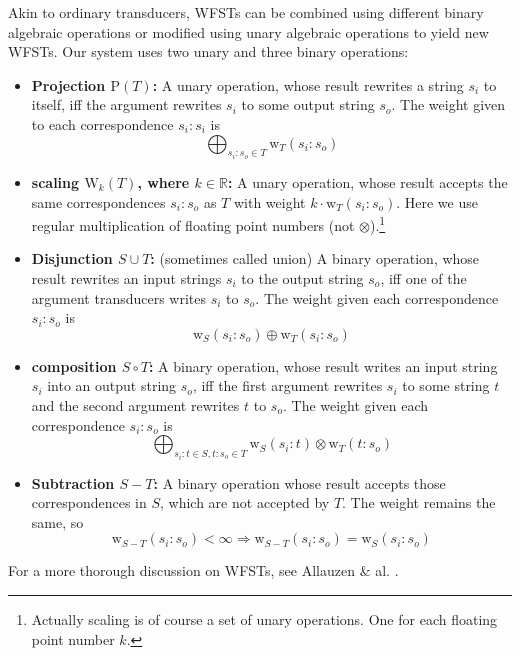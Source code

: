\documentclass[a4paper,conference]{IEEEtran}
\begin{document}
Akin to ordinary transducers, WFSTs can be combined using
different binary algebraic operations or modified using unary
algebraic operations to yield new WFSTs. Our system uses two unary and three binary operations:
\begin{itemize}
\item {\bf Projection $\mathrm{P}(T)$:} A unary operation, whose result
  rewrites a string $s_i$ to itself, iff the argument rewrites $s_i$
  to some output string $s_o$. The weight given to each correspondence
  $s_i:s_i$ is
  \begin{equation}
    \bigoplus_{s_i\mathrm{:}s_o \in T} \mathrm{w}_T(s_i\mathrm{:}s_o)
  \end{equation}
\item {\bf scaling $\mathrm{W}_k(T)$, where $k \in \mathbb{R}$:} A unary operation, whose result accepts the same correspondences $s_i\mathrm{:}s_o$ as $T$ with weight $k\cdot \mathrm{w}_T(s_i\mathrm{:}s_o)$. Here we use regular multiplication of floating point numbers (not $\otimes$).\footnote{Actually scaling is of course a set of unary operations. One for each floating point number $k$.}
\item {\bf Disjunction $S \cup T$:} (sometimes called union) A binary
  operation, whose result rewrites an input strings $s_i$ to the
  output string $s_o$, iff one of the argument transducers writes
  $s_i$ to $s_o$. The weight given each correspondence
  $s_i\mathrm{:}s_o$ is
  \begin{equation}
    \mathrm{w}_S(s_i\mathrm{:}s_o) \oplus \mathrm{w}_T(s_i\mathrm{:}s_o)
  \end{equation}
\item {\bf composition $S \circ T$:} A binary operation, whose result
  writes an input string $s_i$ into an output string $s_o$, iff the
  first argument rewrites $s_i$ to some string $t$ and the second
  argument rewrites $t$ to $s_o$. The weight given each correspondence
  $s_i\mathrm{:}s_o$ is
  \begin{equation}
    \bigoplus_{s_i\mathrm{:}t \in S, t\mathrm{:}s_o \in T} \mathrm{w}_S(s_i\mathrm{:}t) \otimes \mathrm{w}_T(t\mathrm{:}s_o)
    \end{equation}
\item {\bf Subtraction $S - T$:} A binary operation whose result accepts those correspondences in $S$, which are not accepted by $T$. The weight remains the same, so
  \begin{equation}
    \mathrm{w}_{S-T}(s_i\mathrm{:}s_o) < \infty \Rightarrow \mathrm{w}_{S-T}(s_i\mathrm{:}s_o) = \mathrm{w}_{S}(s_i\mathrm{:}s_o)
  \end{equation}
\end{itemize}
For a more thorough discussion on WFSTs, see Allauzen \& al. \cite{openfst/2007}.
\end{document}
